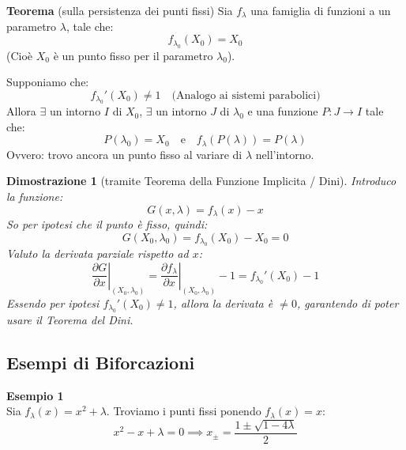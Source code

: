 \documentclass[openany]{book}
\newtheorem*{dimostrazione}{Dimostrazione}
\theoremstyle{definition}
\theoremstyle{remark}
\begin{document}
\textbf{Teorema} (sulla persistenza dei punti fissi)
Sia $f_\lambda$ una famiglia di funzioni a un parametro $\lambda$, tale che:
$$ f_{\lambda_0}(X_0) = X_0 $$
(Cioè $X_0$ è un punto fisso per il parametro $\lambda_0$).

Supponiamo che:
$$ f_{\lambda_0}'(X_0) \neq 1 \quad \text{(Analogo ai sistemi parabolici)} $$
Allora $\exists$ un intorno $I$ di $X_0$, $\exists$ un intorno $J$ di $\lambda_0$ e una funzione $P: J \to I$ tale che:
$$ P(\lambda_0) = X_0 \quad \text{e} \quad f_\lambda(P(\lambda)) = P(\lambda) $$
Ovvero: trovo ancora un punto fisso al variare di $\lambda$ nell'intorno.

\begin{dimostrazione}[tramite Teorema della Funzione Implicita / Dini]
Introduco la funzione:
$$ G(x, \lambda) = f_\lambda(x) - x $$
So per ipotesi che il punto è fisso, quindi:
$$ G(X_0, \lambda_0) = f_{\lambda_0}(X_0) - X_0 = 0 $$
Valuto la derivata parziale rispetto ad $x$:
$$ \left. \frac{\partial G}{\partial x} \right|_{(X_0, \lambda_0)} = \left. \frac{\partial f_\lambda}{\partial x} \right|_{(X_0, \lambda_0)} - 1 = f_{\lambda_0}'(X_0) - 1 $$
Essendo per ipotesi $f_{\lambda_0}'(X_0) \neq 1$, allora la derivata è $\neq 0$, garantendo di poter usare il Teorema del Dini. 
\end{dimostrazione}

\subsection*{Esempi di Biforcazioni}

\textbf{Esempio 1} \\
Sia $f_\lambda(x) = x^2 + \lambda$. Troviamo i punti fissi ponendo $f_\lambda(x) = x$:
$$ x^2 - x + \lambda = 0 \implies x_\pm = \frac{1 \pm \sqrt{1 - 4\lambda}}{2} $$
\end{document}
